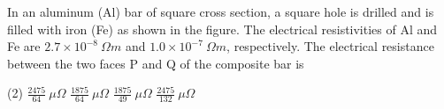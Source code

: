 

    \item In an aluminum (Al) bar of square cross section, a square hole is drilled and is filled with iron (Fe) as shown in the figure. The electrical resistivities of Al and Fe are \(2.7 \times 10^{-8}\ \Omega m\) and \(1.0 \times 10^{-7}\ \Omega m\), respectively. The electrical resistance between the two faces P and Q of the composite bar is
    \begin{center}
    \end{center}
        \begin{tasks}(2)
            \task \(\frac{2475}{64}\ \mu\Omega\)
            \task \(\frac{1875}{64}\ \mu\Omega\)
            \task \(\frac{1875}{49}\ \mu\Omega\)
            \task \(\frac{2475}{132}\ \mu\Omega\)
        \end{tasks}



